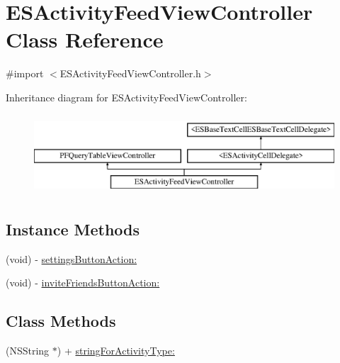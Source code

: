 \hypertarget{interface_e_s_activity_feed_view_controller}{}\section{E\+S\+Activity\+Feed\+View\+Controller Class Reference}
\label{interface_e_s_activity_feed_view_controller}


{\ttfamily \#import $<$E\+S\+Activity\+Feed\+View\+Controller.\+h$>$}

Inheritance diagram for E\+S\+Activity\+Feed\+View\+Controller\+:\begin{figure}[H]
\begin{center}
\leavevmode
\includegraphics[height=3.000000cm]{interface_e_s_activity_feed_view_controller}
\end{center}
\end{figure}
\subsection*{Instance Methods}
\begin{DoxyCompactItemize}
\item 
(void) -\/ \hyperlink{interface_e_s_activity_feed_view_controller_a7b19a15da0e2758bf3209e35325d1ba6}{settings\+Button\+Action\+:}
\item 
(void) -\/ \hyperlink{interface_e_s_activity_feed_view_controller_a2774900f117abbf7b7a6fd4d844de5e3}{invite\+Friends\+Button\+Action\+:}
\end{DoxyCompactItemize}
\subsection*{Class Methods}
\begin{DoxyCompactItemize}
\item 
(N\+S\+String $\ast$) + \hyperlink{interface_e_s_activity_feed_view_controller_a891b463944ccb25359e5aefb9b6589f4}{string\+For\+Activity\+Type\+:}
\end{DoxyCompactItemize}
